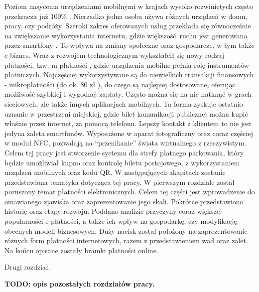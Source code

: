 Poziom nasycenia urządzeniami mobilnymi w krajach wysoko rozwiniętych często przekracza już 100\% \cite{biblia_ebiznesu}. Nierzadko jedna osoba używa różnych urządzeń w domu, pracy, czy podróży. Szeroki zakres oferowanych usług przekłada się równocześnie na zwiększanie wykorzystania internetu, gdzie większość ruchu jest generowana przez smartfony \cite{ruch_mobilny-internet}. To wpływa na zmiany społeczne oraz gospodarcze, w tym także e-biznes. Wraz z rozwojem technologicznym wykształcił się nowy rodzaj płatności, tzw. m-płatności \cite{biblia_ebiznesu}, gdzie urządzenia mobilne pełnią rolę instrumentów płatniczych. Najczęściej wykorzystywane są do niewielkich transakcji finansowych - mikropłatności (do ok. 80 zł \cite{elektroniczne_metody_platnosci}), do czego są najlepiej dostosowane, oferując możliwość szybkiej i wygodnej zapłaty. Często można się na nie natknąć w grach sieciowych, ale także innych aplikacjach mobilnych. Ta forma zyskuje ostatnio uznanie w przestrzeni miejskiej, gdzie bilet komunikacji publicznej można kupić właśnie przez internet, za pomocą telefonu. Lepszy kontakt z klientem to nie jest jedyna zaleta smartfonów. Wyposażone w aparat fotograficzny oraz coraz częściej w moduł NFC, pozwalają na ``przenikanie'' świata wirtualnego z rzeczywistym. 
Celem tej pracy jest stworzenie systemu dla strefy płatnego parkowania, który będzie umożliwiał kupno oraz kontrolę biletu postojowego, z wykorzystaniem urządzeń mobilnych oraz kodu QR. W następujących akapitach zostanie przedstawiona tematyka dotycząca tej pracy.
W pierwszym rozdziale został poruszony temat płatności elektronicznych. Celem tej części jest wprowadzenie do omawianego zjawiska oraz zaprezentowanie jego skali. Pokrótce przedstawiono historię oraz etapy rozwoju. Poddano analizie przyczyny coraz większej popularności e-płatności, a także ich wpływ na gospodarkę, czy modyfikację obecnych modeli biznesowych. Duży nacisk został położony na zaprezentowanie różnych form płatności internetowych, razem z przedstawieniem wad oraz zalet. Na końcu opisane zostały bramki płatności online.

Drugi rozdział.

\textbf{TODO: opis pozostałych rozdziałów pracy.}

